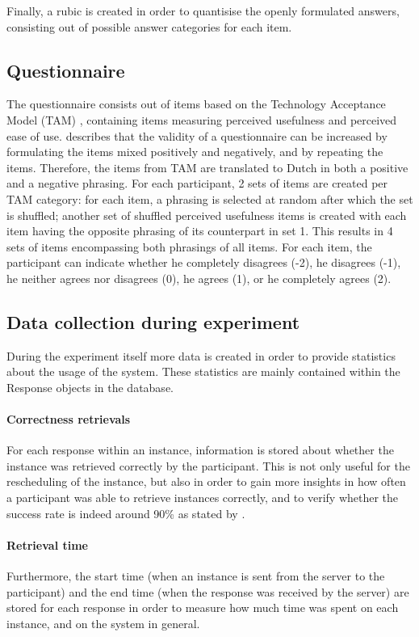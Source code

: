 Finally, a rubic is created in order to quantisise the openly formulated answers, consisting out of possible answer categories for each item.

\subsection{Questionnaire}

The questionnaire consists out of items based on the Technology Acceptance Model (TAM) \cite{tam}, containing items measuring perceived usefulness and perceived ease of use.  describes that the validity of a questionnaire can be increased by formulating the items mixed positively and negatively, and by repeating the items. Therefore, the items from TAM are translated to Dutch in both a positive and a negative phrasing. For each participant, 2 sets of items are created per TAM category: for each item, a phrasing is selected at random after which the set is shuffled; another set of shuffled perceived usefulness items is created with each item having the opposite phrasing of its counterpart in set 1. This results in 4 sets of items encompassing both phrasings of all items. For each item, the participant can indicate whether he completely disagrees (-2), he disagrees (-1), he neither agrees nor disagrees (0), he agrees (1), or he completely agrees (2).

\subsection{Data collection during experiment}

During the experiment itself more data is created in order to provide statistics about the usage of the system. These statistics are mainly contained within the Response objects in the database.

\paragraph{Correctness retrievals} For each response within an instance, information is stored about whether the instance was retrieved correctly by the participant. This is not only useful for the rescheduling of the instance, but also in order to gain more insights in how often a participant was able to retrieve instances correctly, and to verify whether the success rate is indeed around 90\% as stated by .

\paragraph{Retrieval time} Furthermore, the start time (when an instance is sent from the server to the participant) and the end time (when the response was received by the server) are stored for each response in order to measure how much time was spent on each instance, and on the system in general.

